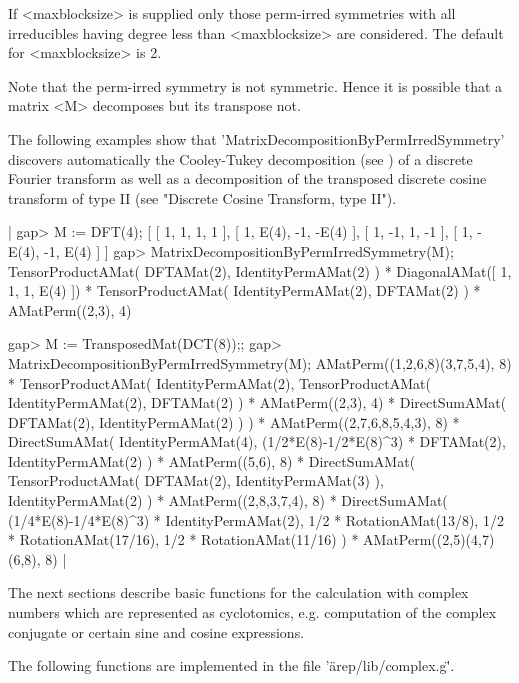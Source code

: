 If <maxblocksize> is supplied only those perm-irred symmetries 
with all irreducibles having degree less than <maxblocksize>
are considered. The default for <maxblocksize> is 2.

Note that the perm-irred symmetry is not symmetric. Hence it is 
possible that a matrix <M> decomposes but its transpose not.

The following examples show that
'MatrixDecompositionByPermIrredSymmetry' discovers automatically the
Cooley-Tukey decomposition (see \cite{CT65}) of a discrete Fourier
transform as well as a decomposition of the transposed 
discrete cosine transform of type II (see "Discrete Cosine Transform, type II").

|    gap> M := DFT(4);
    [ [ 1, 1, 1, 1 ], [ 1, E(4), -1, -E(4) ], [ 1, -1, 1, -1 ], 
      [ 1, -E(4), -1, E(4) ] ]
    gap> MatrixDecompositionByPermIrredSymmetry(M);
    TensorProductAMat(
      DFTAMat(2),
      IdentityPermAMat(2)
    ) *
    DiagonalAMat([ 1, 1, 1, E(4) ]) *
    TensorProductAMat(
      IdentityPermAMat(2),
      DFTAMat(2)
    ) *
    AMatPerm((2,3), 4)

    gap> M := TransposedMat(DCT(8));;
    gap> MatrixDecompositionByPermIrredSymmetry(M);
    AMatPerm((1,2,6,8)(3,7,5,4), 8) *
    TensorProductAMat(
      IdentityPermAMat(2),
      TensorProductAMat(
        IdentityPermAMat(2),
        DFTAMat(2)
      ) *
      AMatPerm((2,3), 4) *
      DirectSumAMat(
        DFTAMat(2),
        IdentityPermAMat(2)
      )
    ) *
    AMatPerm((2,7,6,8,5,4,3), 8) *
    DirectSumAMat(
      IdentityPermAMat(4),
      (1/2*E(8)-1/2*E(8)^3) * DFTAMat(2),
      IdentityPermAMat(2)
    ) *
    AMatPerm((5,6), 8) *
    DirectSumAMat(
      TensorProductAMat(
        DFTAMat(2),
        IdentityPermAMat(3)
      ),
      IdentityPermAMat(2)
    ) *
    AMatPerm((2,8,3,7,4), 8) *
    DirectSumAMat(
      (1/4*E(8)-1/4*E(8)^3) * IdentityPermAMat(2),
      1/2 * RotationAMat(13/8),
      1/2 * RotationAMat(17/16),
      1/2 * RotationAMat(11/16)
    ) *
    AMatPerm((2,5)(4,7)(6,8), 8) |


The next sections describe basic functions for the calculation 
with complex numbers which are represented as cyclotomics, 
e.g. computation of the complex conjugate or certain sine 
and cosine expressions.

The following functions are implemented in the file
'\"arep/lib/complex.g\"'.

